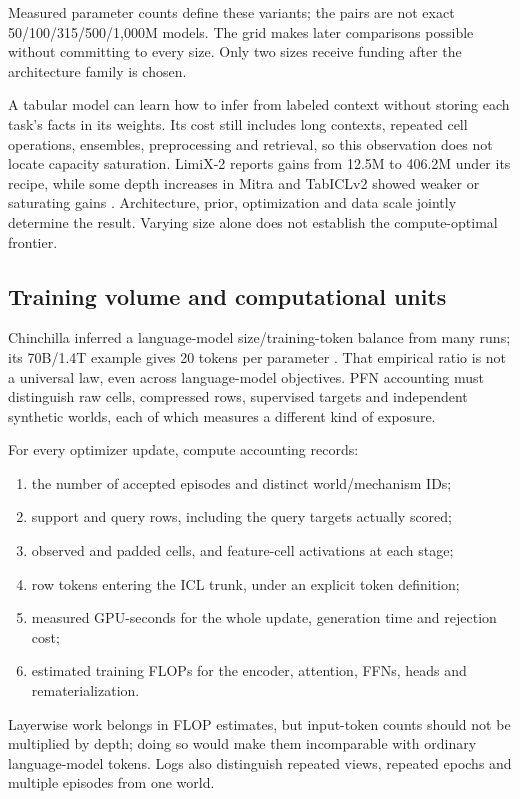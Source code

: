 \documentclass[11pt]{article}
\begin{document}
Measured parameter counts define these variants; the pairs are not exact 50/100/315/500/1,000M models. The grid makes later comparisons possible without committing to every size. Only two sizes receive funding after the architecture family is chosen.

A tabular model can learn how to infer from labeled context without storing each task's facts in its weights. Its cost still includes long contexts, repeated cell operations, ensembles, preprocessing and retrieval, so this observation does not locate capacity saturation. LimiX-2 reports gains from 12.5M to 406.2M under its recipe, while some depth increases in Mitra and TabICLv2 showed weaker or saturating gains \cite{limix2,mitra,tabicl2}. Architecture, prior, optimization and data scale jointly determine the result. Varying size alone does not establish the compute-optimal frontier.

\subsection{Training volume and computational units}

Chinchilla inferred a language-model size/training-token balance from many runs; its 70B/1.4T example gives 20 tokens per parameter \cite{chinchilla}. That empirical ratio is not a universal law, even across language-model objectives. PFN accounting must distinguish raw cells, compressed rows, supervised targets and independent synthetic worlds, each of which measures a different kind of exposure.

For every optimizer update, compute accounting records:
\begin{enumerate}
\item the number of accepted episodes and distinct world/mechanism IDs;
\item support and query rows, including the query targets actually scored;
\item observed and padded cells, and feature-cell activations at each stage;
\item row tokens entering the ICL trunk, under an explicit token definition;
\item measured GPU-seconds for the whole update, generation time and rejection cost;
\item estimated training FLOPs for the encoder, attention, FFNs, heads and rematerialization.
\end{enumerate}
Layerwise work belongs in FLOP estimates, but input-token counts should not be multiplied by depth; doing so would make them incomparable with ordinary language-model tokens. Logs also distinguish repeated views, repeated epochs and multiple episodes from one world.
\end{document}

